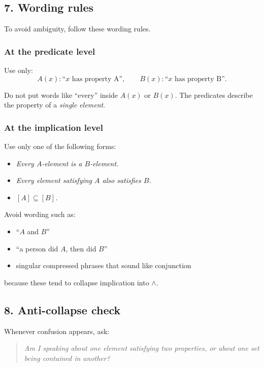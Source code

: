 \documentclass{article}
\begin{document}
	\subsection*{7. Wording rules}
	To avoid ambiguity, follow these wording rules.
	
	\subsubsection*{At the predicate level}
	Use only:
	\[
	A(x): \text{``\(x\) has property A''},
	\qquad
	B(x): \text{``\(x\) has property B''}.
	\]
	
	Do not put words like ``every'' inside \(A(x)\) or \(B(x)\).  
	The predicates describe the property of a \emph{single element}.
	
	\subsubsection*{At the implication level}
	Use only one of the following forms:
	
	\begin{itemize}
		\item \emph{Every \(A\)-element is a \(B\)-element.}
		\item \emph{Every element satisfying \(A\) also satisfies \(B\).}
		\item \emph{\([A]\subseteq[B]\).}
	\end{itemize}
	
	Avoid wording such as:
	
	\begin{itemize}
		\item ``\(A\) and \(B\)''
		\item ``a person did \(A\), then did \(B\)''
		\item singular compressed phrases that sound like conjunction
	\end{itemize}
	
	because these tend to collapse implication into \(\land\).
	
	\subsection*{8. Anti-collapse check}
	Whenever confusion appears, ask:
	
	\begin{quote}
		\emph{Am I speaking about one element satisfying two properties, or about one set being contained in another?}
	\end{quote}
	
\end{document}
